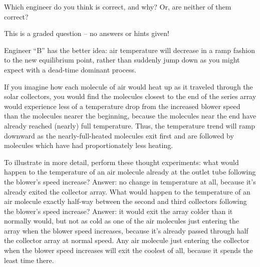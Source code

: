 \vskip 10pt

Which engineer do you think is correct, and why?  Or, are neither of them correct? 

\vfil

\eject






This is a graded question -- no answers or hints given!







Engineer ``B'' has the better idea: air temperature will decrease in a ramp fashion to the new equilibrium point, rather than suddenly jump down as you might expect with a dead-time dominant process.

\vskip 10pt

If you imagine how each molecule of air would heat up as it traveled through the solar collectors, you would find the molecules closest to the end of the series array would experience less of a temperature drop from the increased blower speed than the molecules nearer the beginning, because the molecules near the end have already reached (nearly) full temperature.  Thus, the temperature trend will ramp downward as the nearly-full-heated molecules exit first and are followed by molecules which have had proportionately less heating. 

To illustrate in more detail, perform these thought experiments: what would happen to the temperature of an air molecule already at the outlet tube following the blower's speed increase?  Answer: no change in temperature at all, because it's already exited the collector array.  What would happen to the temperature of an air molecule exactly half-way between the second and third collectors following the blower's speed increase?  Answer: it would exit the array colder than it normally would, but not as cold as one of the air molecules just entering the array when the blower speed increases, because it's already passed through half the collector array at normal speed.  Any air molecule just entering the collector when the blower speed increases will exit the coolest of all, because it spends the least time there.

